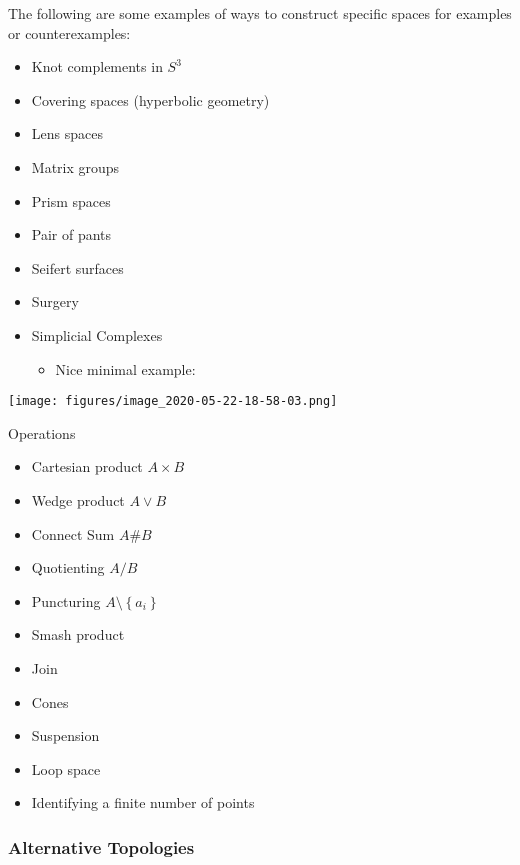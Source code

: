 \begin{example}

The following are some examples of ways to construct specific spaces for
examples or counterexamples:

\begin{itemize}
\item
  Knot complements in \(S^3\)
\item
  Covering spaces (hyperbolic geometry)
\item
  Lens spaces
\item
  Matrix groups
\item
  Prism spaces
\item
  Pair of pants
\item
  Seifert surfaces
\item
  Surgery
\item
  Simplicial Complexes

  \begin{itemize}
  \tightlist
  \item
    Nice minimal example:
  \end{itemize}
\end{itemize}

\texttt{[image: figures/image\_2020-05-22-18-58-03.png]}

\end{example}

Operations

\begin{itemize}
\tightlist
\item
  Cartesian product \(A\times B\)
\item
  Wedge product \(A \vee B\)
\item
  Connect Sum \(A \# B\)
\item
  Quotienting \(A/B\)
\item
  Puncturing \(A\setminus \left\{{a_{i}}\right\}\)
\item
  Smash product
\item
  Join
\item
  Cones
\item
  Suspension
\item
  Loop space
\item
  Identifying a finite number of points
\end{itemize}

\hypertarget{alternative-topologies}{%
\subsubsection{Alternative Topologies}\label{alternative-topologies}}

